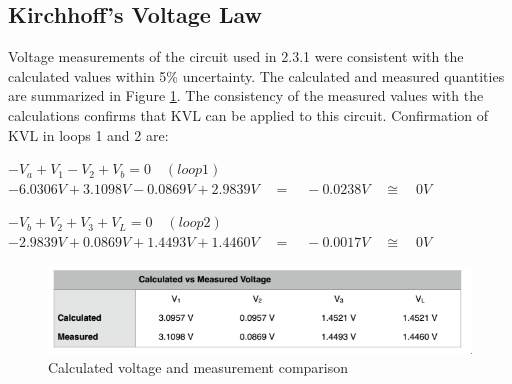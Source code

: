 \documentclass[12pt]{article}
\begin{document}

\pagebreak

\subsection{Kirchhoff's Voltage Law}
Voltage measurements of the circuit used in 2.3.1 were consistent with the calculated values 
within 5\% uncertainty. The calculated and measured quantities are summarized in Figure \ref{fig.Voltage}.
The consistency of the measured values with the calculations confirms that KVL can be applied 
to this circuit.
Confirmation of KVL in loops 1 and 2 are:

\begin{center}
	$-{ V }_{ a }+{ V }_{ 1 }-{ V }_{ 2 }+{ V }_{ b }=0\quad (loop 1)$\\
	$-6.0306V+3.1098V-0.0869V+2.9839V\quad =\quad -0.0238V\quad \cong \quad 0V$\\[1em]
\end{center}

\begin{center}
	$-{ V }_{ b }+{ V }_{ 2 }+{ V }_{ 3 }+{ V }_{ L }=0\quad (loop 2)$\\
	$-2.9839V+0.0869V+1.4493V+1.4460V\quad =\quad -0.0017V\quad \cong \quad 0V$\\[1em]
\end{center}

\begin{figure}[htbp]
	\centering
	\includegraphics[scale=1]{VoltageLawMeasurement.png}
	\caption{Calculated voltage and measurement comparison}
	\label{fig.Voltage}
\end{figure}
\pagebreak
\end{document}
